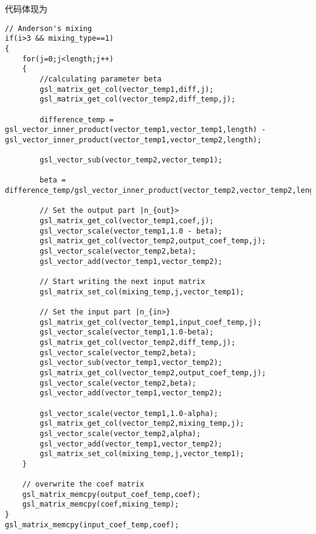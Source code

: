 \documentclass[12pt,a4paper,openany,twoside]{article}
\numberwithin{equation}{section}
\begin{document}
                代码体现为
                \begin{lstlisting}
// Anderson's mixing
if(i>3 && mixing_type==1)
{
    for(j=0;j<length;j++)
    {
        //calculating parameter beta
        gsl_matrix_get_col(vector_temp1,diff,j);
        gsl_matrix_get_col(vector_temp2,diff_temp,j);

        difference_temp = gsl_vector_inner_product(vector_temp1,vector_temp1,length) - gsl_vector_inner_product(vector_temp1,vector_temp2,length);

        gsl_vector_sub(vector_temp2,vector_temp1);

        beta = difference_temp/gsl_vector_inner_product(vector_temp2,vector_temp2,length);

        // Set the output part |n_{out}>
        gsl_matrix_get_col(vector_temp1,coef,j);
        gsl_vector_scale(vector_temp1,1.0 - beta);
        gsl_matrix_get_col(vector_temp2,output_coef_temp,j);
        gsl_vector_scale(vector_temp2,beta);
        gsl_vector_add(vector_temp1,vector_temp2);

        // Start writing the next input matrix
        gsl_matrix_set_col(mixing_temp,j,vector_temp1);

        // Set the input part |n_{in>}
        gsl_matrix_get_col(vector_temp1,input_coef_temp,j);
        gsl_vector_scale(vector_temp1,1.0-beta);
        gsl_matrix_get_col(vector_temp2,diff_temp,j);
        gsl_vector_scale(vector_temp2,beta);
        gsl_vector_sub(vector_temp1,vector_temp2);
        gsl_matrix_get_col(vector_temp2,output_coef_temp,j);
        gsl_vector_scale(vector_temp2,beta);
        gsl_vector_add(vector_temp1,vector_temp2);                

        gsl_vector_scale(vector_temp1,1.0-alpha);
        gsl_matrix_get_col(vector_temp2,mixing_temp,j);
        gsl_vector_scale(vector_temp2,alpha);
        gsl_vector_add(vector_temp1,vector_temp2);
        gsl_matrix_set_col(mixing_temp,j,vector_temp1);
    }

    // overwrite the coef matrix
    gsl_matrix_memcpy(output_coef_temp,coef);
    gsl_matrix_memcpy(coef,mixing_temp);
}     
gsl_matrix_memcpy(input_coef_temp,coef);  
                \end{lstlisting}
\end{document}

